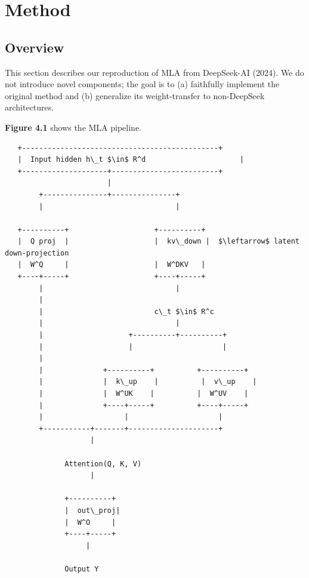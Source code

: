 
\section{Method}

\subsection{Overview}

This section describes our reproduction of MLA from DeepSeek-AI (2024). We 
do not introduce novel components; the goal is to (a) faithfully implement 
the original method and (b) generalize its weight-transfer to 
non-DeepSeek architectures.

\textbf{Figure 4.1} shows the MLA pipeline.

\begin{lstlisting}
   +----------------------------------------------+
   |  Input hidden h\_t $\in$ R^d                      |
   +--------------------+-------------------------+
                        |
        +---------------+---------------+
        |                               |
                                         
   +----------+                    +----------+
   |  Q proj  |                    |  kv\_down |  $\leftarrow$ latent down-projection
   |  W^Q     |                    |  W^DKV   |
   +----+-----+                    +----+-----+
        |                               |
        |                                
        |                          c\_t $\in$ R^c
        |                               |
        |                    +----------+----------+
        |                    |                     |
        |                                           
        |              +----------+          +----------+
        |              |  k\_up    |          |  v\_up    |
        |              |  W^UK    |          |  W^UV    |
        |              +----+-----+          +----+-----+
        |                   |                     |
        +-----------+-------+---------------------+
                    |
                     
              Attention(Q, K, V)
                    |
                     
              +----------+
              |  out\_proj|
              |  W^O     |
              +----+-----+
                   |
                    
              Output Y
\end{lstlisting}

